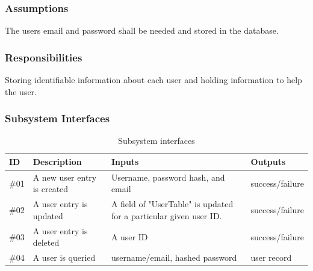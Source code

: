 \subsubsection{Assumptions}
The users email and password shall be needed and stored in the database.

\subsubsection{Responsibilities}
Storing identifiable information about each user and holding information to help the user.


\subsubsection{Subsystem Interfaces}
\begin {table}[H]
\caption {Subsystem interfaces} 
\begin{center}
    \begin{tabular}{ | p{1cm} | p{6cm} | p{3cm} | p{3cm} |}
    \hline
    ID & Description & Inputs & Outputs \\ \hline
    \#01 & A new user entry is created & Username, password hash, and email & success/failure  \\ \hline
    \#02 & A user entry is updated & A field of "UserTable" is updated for a particular given user ID. & success/failure  \\ \hline
    \#03 & A user entry is deleted & A user ID & success/failure  \\ \hline
    \#04 & A user is queried & username/email, hashed password & user record  \\ \hline
    \end{tabular}
\end{center}
\end{table}


